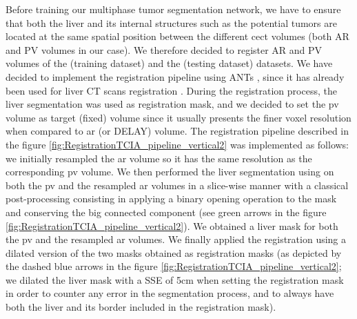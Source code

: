 Before training our multiphase tumor segmentation network, we have to ensure that both the liver and its internal structures such as the potential tumors are located at the same spatial position between
the different \ac{cect} volumes (both AR and PV volumes in our case). We therefore decided to register AR and PV volumes of the \textbf{} (training dataset) and the \textbf{} (testing dataset) datasets.
We have decided to implement the registration pipeline using ANTs \cite{avants2009advanced}, since it has already been used for liver
CT scans registration \cite{Zhao2019,Zhao2020}.
During the registration process, the liver segmentation was used as
registration mask, and we decided to set the \ac{pv} volume as target (fixed)
volume since it usually presents the finer voxel resolution when
compared to \ac{ar} (or DELAY) volume. The registration pipeline described in the figure \ref{fig:RegistrationTCIA_pipeline_vertical2} was implemented as follows: we initially resampled the \ac{ar} volume so it has the same resolution as the corresponding \ac{pv} volume. We then performed the liver segmentation using  on both the \ac{pv} and the resampled \ac{ar} volumes in a slice-wise manner with a classical post-processing consisting in applying a binary opening operation to the mask and conserving the big connected component (see green arrows in the figure \ref{fig:RegistrationTCIA_pipeline_vertical2}). We obtained a liver mask for both the \ac{pv} and the resampled \ac{ar} volumes. We finally applied the registration using a dilated version of the two masks obtained as registration masks (as depicted by the dashed blue arrows in the figure \ref{fig:RegistrationTCIA_pipeline_vertical2}; we dilated the liver mask with a SSE of 5cm when setting the registration mask in order to counter any error in the segmentation process, and to always have both the liver and its border included in the registration mask).

